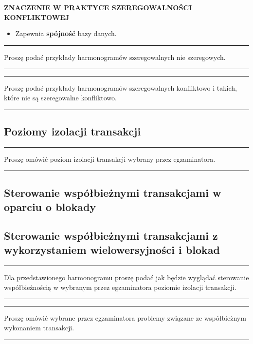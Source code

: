 \documentclass[a5paper,6pt]{article}
\newcommand{\horrule}[1]{\rule{\linewidth}{#1}}
\begin{document}
    \textbf{ZNACZENIE W PRAKTYCE SZEREGOWALNOŚCI KONFLIKTOWEJ}
    \begin{itemize}
        \item Zapewnia \textbf{spójność} bazy danych.
    \end{itemize}

    \horrule{0.5pt}
    Proszę podać przykłady harmonogramów szeregowalnych nie szeregowych.\\
    \horrule{0.5pt}

    \horrule{0.5pt}
    Proszę podać przykłady harmonogramów szeregowalnych konfliktowo i takich,
    które nie są szeregowalne konfliktowo.\\
    \horrule{0.5pt}


    \subsection{Poziomy izolacji transakcji} %
    \label{sub:poziomy_izolacji_transakcji}

    \horrule{0.5pt}
    Proszę omówić poziom izolacji transakcji wybrany przez egzaminatora.\\
    \horrule{0.5pt}



    \subsection{Sterowanie współbieżnymi transakcjami w oparciu o blokady} %
    \label{sub:sterowanie_wspolbieznymi_blokady}


    \subsection{Sterowanie współbieżnymi transakcjami z wykorzystaniem
    wielowersyjności i blokad} %
    \label{sub:sterowanie_wspolbieznymi_wielowier}

    \horrule{0.5pt}
    Dla przedstawionego harmonogramu proszę podać jak będzie wyglądać sterowanie
    współbieżnością w wybranym przez egzaminatora poziomie izolacji
    transakcji.\\
    \horrule{0.5pt}

    \horrule{0.5pt}
    Proszę omówić wybrane przez egzaminatora problemy związane ze współbieżnym
    wykonaniem transakcji.\\
    \horrule{0.5pt}
\end{document}
